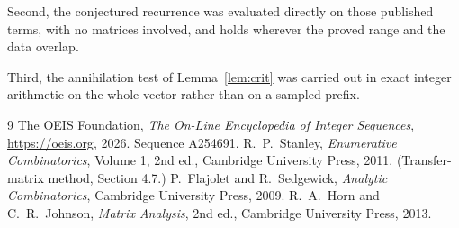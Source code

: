 \documentclass[11pt,a4paper]{article}
\theoremstyle{plain}
\theoremstyle{definition}
\begin{document}
Second, the conjectured recurrence was evaluated directly on those published terms, with no
matrices involved, and holds wherever the proved range and the data overlap.

Third, the annihilation test of Lemma~\ref{lem:crit} was carried out in exact integer
arithmetic on the whole vector rather than on a sampled prefix.

\begin{thebibliography}{9}
 The OEIS Foundation, \emph{The On-Line Encyclopedia of Integer
Sequences}, \url{https://oeis.org}, 2026. Sequence A254691.
 R.~P.~Stanley, \emph{Enumerative Combinatorics}, Volume 1, 2nd ed.,
Cambridge University Press, 2011. (Transfer-matrix method, Section 4.7.)
 P.~Flajolet and R.~Sedgewick, \emph{Analytic Combinatorics}, Cambridge
University Press, 2009.
 R.~A.~Horn and C.~R.~Johnson, \emph{Matrix Analysis}, 2nd ed., Cambridge
University Press, 2013.
\end{thebibliography}
\end{document}
